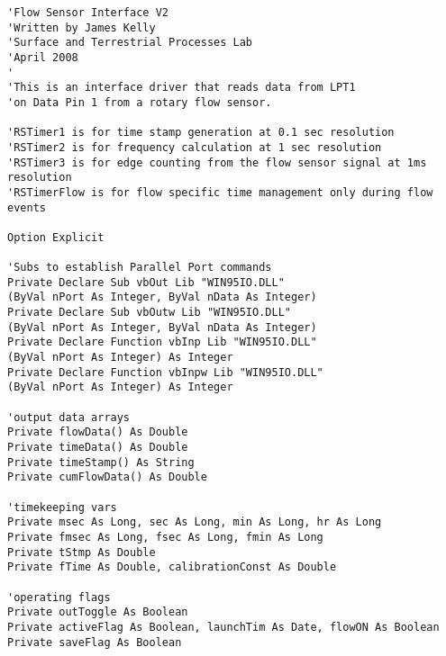 \vspace{10cm}


\begin{singlespace}
\begin{small}
\begin{verbatim}
'Flow Sensor Interface V2
'Written by James Kelly
'Surface and Terrestrial Processes Lab
'April 2008
'
'This is an interface driver that reads data from LPT1
'on Data Pin 1 from a rotary flow sensor.

'RSTimer1 is for time stamp generation at 0.1 sec resolution
'RSTimer2 is for frequency calculation at 1 sec resolution
'RSTimer3 is for edge counting from the flow sensor signal at 1ms resolution
'RSTimerFlow is for flow specific time management only during flow events

Option Explicit

'Subs to establish Parallel Port commands
Private Declare Sub vbOut Lib "WIN95IO.DLL" 
(ByVal nPort As Integer, ByVal nData As Integer)
Private Declare Sub vbOutw Lib "WIN95IO.DLL" 
(ByVal nPort As Integer, ByVal nData As Integer)
Private Declare Function vbInp Lib "WIN95IO.DLL" 
(ByVal nPort As Integer) As Integer
Private Declare Function vbInpw Lib "WIN95IO.DLL" 
(ByVal nPort As Integer) As Integer

'output data arrays
Private flowData() As Double
Private timeData() As Double
Private timeStamp() As String
Private cumFlowData() As Double

'timekeeping vars
Private msec As Long, sec As Long, min As Long, hr As Long
Private fmsec As Long, fsec As Long, fmin As Long
Private tStmp As Double
Private fTime As Double, calibrationConst As Double

'operating flags
Private outToggle As Boolean
Private activeFlag As Boolean, launchTim As Date, flowON As Boolean
Private saveFlag As Boolean


\end{verbatim}
\end{small}
\end{singlespace}

